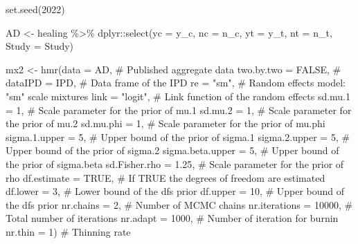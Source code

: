 \documentclass[
  letterpaper,
  DIV=11,
  numbers=noendperiod]{scrreprt}
\newenvironment{Shaded}{\begin{snugshade}}{\end{snugshade}}
\newcommand{\AttributeTok}[1]{\textcolor[rgb]{0.40,0.45,0.13}{#1}}
\newcommand{\CommentTok}[1]{\textcolor[rgb]{0.37,0.37,0.37}{#1}}
\newcommand{\ConstantTok}[1]{\textcolor[rgb]{0.56,0.35,0.01}{#1}}
\newcommand{\DecValTok}[1]{\textcolor[rgb]{0.68,0.00,0.00}{#1}}
\newcommand{\FloatTok}[1]{\textcolor[rgb]{0.68,0.00,0.00}{#1}}
\newcommand{\FunctionTok}[1]{\textcolor[rgb]{0.28,0.35,0.67}{#1}}
\newcommand{\NormalTok}[1]{\textcolor[rgb]{0.00,0.23,0.31}{#1}}
\newcommand{\OtherTok}[1]{\textcolor[rgb]{0.00,0.23,0.31}{#1}}
\newcommand{\SpecialCharTok}[1]{\textcolor[rgb]{0.37,0.37,0.37}{#1}}
\newcommand{\StringTok}[1]{\textcolor[rgb]{0.13,0.47,0.30}{#1}}
\begin{document}
\begin{Shaded}
\begin{Highlighting}[]
\FunctionTok{set.seed}\NormalTok{(}\DecValTok{2022}\NormalTok{)}

\NormalTok{AD }\OtherTok{\textless{}{-}}\NormalTok{ healing }\SpecialCharTok{\%\textgreater{}\%}\NormalTok{ dplyr}\SpecialCharTok{::}\FunctionTok{select}\NormalTok{(}\AttributeTok{yc =}\NormalTok{ y\_c, }\AttributeTok{nc =}\NormalTok{ n\_c, }
                                \AttributeTok{yt =}\NormalTok{ y\_t, }\AttributeTok{nt =}\NormalTok{ n\_t, }\AttributeTok{Study =}\NormalTok{ Study)}

\NormalTok{mx2 }\OtherTok{\textless{}{-}} \FunctionTok{hmr}\NormalTok{(}\AttributeTok{data =}\NormalTok{ AD,               }\CommentTok{\# Published aggregate data}
           \AttributeTok{two.by.two =} \ConstantTok{FALSE}\NormalTok{,      }\CommentTok{\# }
           \AttributeTok{dataIPD =}\NormalTok{ IPD,           }\CommentTok{\# Data frame of the IPD }
           \AttributeTok{re =} \StringTok{"sm"}\NormalTok{,               }\CommentTok{\# Random effects model: "sm" scale mixtures }
           \AttributeTok{link =} \StringTok{"logit"}\NormalTok{,          }\CommentTok{\# Link function of the random effects}
           \AttributeTok{sd.mu.1 =} \DecValTok{1}\NormalTok{,             }\CommentTok{\# Scale parameter for the prior of mu.1}
           \AttributeTok{sd.mu.2 =} \DecValTok{1}\NormalTok{,             }\CommentTok{\# Scale parameter for the prior of mu.2 }
           \AttributeTok{sd.mu.phi =} \DecValTok{1}\NormalTok{,           }\CommentTok{\# Scale parameter for the prior of mu.phi }
           \AttributeTok{sigma.1.upper =} \DecValTok{5}\NormalTok{,       }\CommentTok{\# Upper bound of the prior of sigma.1  }
           \AttributeTok{sigma.2.upper =} \DecValTok{5}\NormalTok{,       }\CommentTok{\# Upper bound of the prior of sigma.2}
           \AttributeTok{sigma.beta.upper =} \DecValTok{5}\NormalTok{,    }\CommentTok{\# Upper bound of the prior of sigma.beta}
           \AttributeTok{sd.Fisher.rho =} \FloatTok{1.25}\NormalTok{,    }\CommentTok{\# Scale parameter for the prior of rho}
           \AttributeTok{df.estimate =} \ConstantTok{TRUE}\NormalTok{,      }\CommentTok{\# If TRUE the degrees of freedom are estimated}
           \AttributeTok{df.lower =} \DecValTok{3}\NormalTok{,            }\CommentTok{\# Lower bound of the df\textquotesingle{}s prior}
           \AttributeTok{df.upper =} \DecValTok{10}\NormalTok{,           }\CommentTok{\# Upper bound of the df\textquotesingle{}s prior}
           \AttributeTok{nr.chains =} \DecValTok{2}\NormalTok{,           }\CommentTok{\# Number of MCMC chains}
           \AttributeTok{nr.iterations =} \DecValTok{10000}\NormalTok{,   }\CommentTok{\# Total number of iterations}
           \AttributeTok{nr.adapt =} \DecValTok{1000}\NormalTok{,         }\CommentTok{\# Number of iteration for burnin }
           \AttributeTok{nr.thin =} \DecValTok{1}\NormalTok{)             }\CommentTok{\# Thinning rate}
\end{Highlighting}
\end{Shaded}
\end{document}
